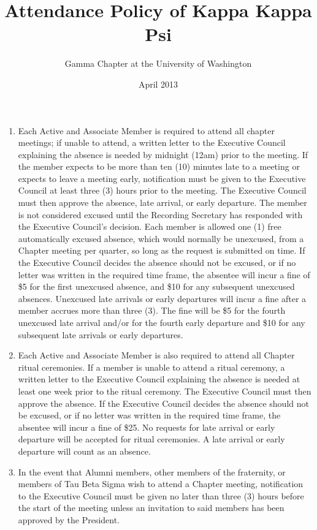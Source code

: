 \documentclass[11pt]{article}
\begin{document}
\title{Attendance Policy of Kappa Kappa Psi}
\author{Gamma Chapter at the University of Washington}
\date{April 2013}
\maketitle

\begin{enumerate}[label=\bfseries Article \Roman*]
\item
  Each Active and Associate Member is required to attend all chapter meetings; if unable to attend, a written letter to the Executive Council explaining the absence is needed by midnight (12am) prior to the meeting. 
  If the member expects to be more than ten (10) minutes late to a meeting or expects to leave a meeting early, notification must be given to the Executive Council at least three (3) hours prior to the meeting.
  The Executive Council must then approve the absence, late arrival, or early departure.
  The member is not considered excused until the Recording Secretary has responded with the Executive Council’s decision.
  Each member is allowed one (1) free automatically excused absence, which would normally be unexcused, from a Chapter meeting per quarter, so long as the request is submitted on time.
  If the Executive Council decides the absence should not be excused, or if no letter was written in the required time frame, the absentee will incur a fine of \$5 for the first unexcused absence, and \$10 for any subsequent unexcused absences.
  Unexcused late arrivals or early departures will incur a fine after a member accrues more than three (3).
  The fine will be \$5 for the fourth unexcused late arrival and/or for the fourth early departure and \$10 for any subsequent late arrivals or early departures.

\item
  Each Active and Associate Member is also required to attend all Chapter ritual ceremonies.
  If a member is unable to attend a ritual ceremony, a written letter to the Executive Council explaining the absence is needed at least one week prior to the ritual ceremony.
  The Executive Council must then approve the absence.
  If the Executive Council decides the absence should not be excused, or if no letter was written in the required time frame, the absentee will incur a fine of \$25.
  No requests for late arrival or early departure will be accepted for ritual ceremonies.
  A late arrival or early departure will count as an absence.

\item
  In the event that Alumni members, other members of the fraternity, or members of Tau Beta Sigma wish to attend a Chapter meeting, notification to the Executive Council must be given no later than three (3) hours before the start of the meeting unless an invitation to said members has been approved by the President.


\end{enumerate}
\end{document}
